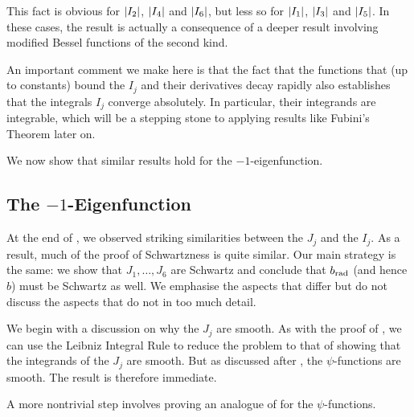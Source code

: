 This fact is obvious for $\left\lvert I_2 \right\rvert$, $\left\lvert I_4 \right\rvert$ and $\left\lvert I_6 \right\rvert$, but less so for $\left\lvert I_1 \right\rvert$, $\left\lvert I_3 \right\rvert$ and $\left\lvert I_5 \right\rvert$. In these cases, the result is actually a consequence of a deeper result involving modified Bessel functions of the second kind.


An important comment we make here is that the fact that the functions that (up to constants) bound the $I_j$ and their derivatives decay rapidly also establishes that the integrals $I_j$ converge absolutely. In particular, their integrands are integrable, which will be a stepping stone to applying results like Fubini's Theorem later on.

We now show that similar results hold for the $-1$-eigenfunction.

\subsection{The $-1$-Eigenfunction}

At the end of , we observed striking similarities between the $J_j$ and the $I_j$. As a result, much of the proof of Schwartzness is quite similar. Our main strategy is the same: we show that $J_1, \ldots, J_6$ are Schwartz and conclude that $b_{\operatorname{rad}}$ (and hence $b$) must be Schwartz as well. We emphasise the aspects that differ but do not discuss the aspects that do not in too much detail.

We begin with a discussion on why the $J_j$ are smooth. As with the proof of , we can use the Leibniz Integral Rule to reduce the problem to that of showing that the integrands of the $J_j$ are smooth. But as discussed after , the $\psi$-functions are smooth. The result is therefore immediate.

A more nontrivial step involves proving an analogue of  for the $\psi$-functions.

